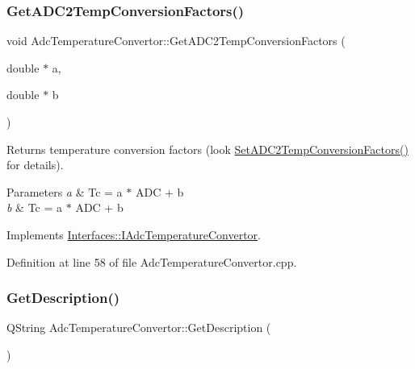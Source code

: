 \subsubsection{\texorpdfstring{Get\+A\+D\+C2\+Temp\+Conversion\+Factors()}{GetADC2TempConversionFactors()}}
{\footnotesize\ttfamily void Adc\+Temperature\+Convertor\+::\+Get\+A\+D\+C2\+Temp\+Conversion\+Factors (\begin{DoxyParamCaption}\item[{double $\ast$}]{a,  }\item[{double $\ast$}]{b }\end{DoxyParamCaption})\hspace{0.3cm}{\ttfamily [virtual]}}



Returns temperature conversion factors (look \hyperlink{class_adc_temperature_convertor_a5a19355f805554763e914e5b2216d5f6}{Set\+A\+D\+C2\+Temp\+Conversion\+Factors()} for details). 


\begin{DoxyParams}{Parameters}
{\em a} & Tc = a $\ast$ A\+DC + b \\
\hline
{\em b} & Tc = a $\ast$ A\+DC + b \\
\hline
\end{DoxyParams}


Implements \hyperlink{class_interfaces_1_1_i_adc_temperature_convertor_a61cff0aa0590906acfb18c9b789dceb2}{Interfaces\+::\+I\+Adc\+Temperature\+Convertor}.



Definition at line 58 of file Adc\+Temperature\+Convertor.\+cpp.

\mbox{\label{class_adc_temperature_convertor_ad82afdddbac46a95b6da44e769180d10}} 
\subsubsection{\texorpdfstring{Get\+Description()}{GetDescription()}}
{\footnotesize\ttfamily Q\+String Adc\+Temperature\+Convertor\+::\+Get\+Description (\begin{DoxyParamCaption}{ }\end{DoxyParamCaption})\hspace{0.3cm}{\ttfamily [virtual]}}



